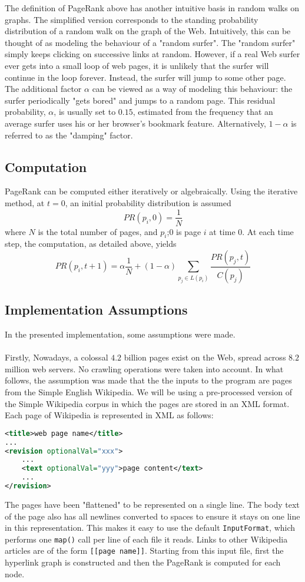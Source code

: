 \documentclass[11pt,a4paper]{article}
\begin{document}
The definition of PageRank above has another intuitive basis in random walks on graphs. The simplified version corresponds to the standing probability distribution of a random walk on the graph of the Web. Intuitively, this can be thought of as modeling the behaviour of a "random surfer". The "random surfer" simply keeps clicking on successive links at random. However, if a real Web surfer ever gets into a small loop of web pages, it is unlikely that the surfer will continue in the loop forever. Instead, the surfer will jump to some other page. The additional factor $\alpha$ can be viewed as a way of modeling this behaviour: the surfer periodically "gets bored" and jumps to a random page.  This residual probability, $\alpha$, is usually set to $0.15$, estimated from the frequency that an average surfer uses his or her browser's bookmark feature. Alternatively, $1 - \alpha$ is referred to as the "damping" factor.
\subsection{Computation}
PageRank can be computed either iteratively or algebraically. Using the iterative method, at $t = 0$, an initial probability distribution is assumed
$$PR(p_i, 0) = \frac{1}{N}$$
where $N$ is the total number of pages, and $p_i$;$0$ is page $i$ at time $0$. At each time step, the computation, as detailed above, yields
$$PR(p_i, t + 1) = \alpha \frac{1}{N} + (1 - \alpha) \sum_{p_j \in L(p_i)}\frac{PR(p_j, t)}{C(p_j)}$$
\subsection{Implementation Assumptions}
In the presented implementation, some assumptions were made.\\
\\
Firstly, 
Nowadays, a colossal $4.2$ billion pages exist on the Web, spread across $8.2$ million web servers. No crawling operations were taken into account. In what follows, the assumption was made that the the inputs to the program are pages from the Simple English Wikipedia. We will be using a pre-processed version of the Simple Wikipedia corpus in which the pages are stored in an XML format. Each page of Wikipedia is represented in XML as follows:
\begin{lstlisting}[language=xml]
<title>web page name</title>
...
<revision optionalVal="xxx">
    ...
    <text optionalVal="yyy">page content</text>
    ...
</revision>
\end{lstlisting}
The pages have been "flattened" to be represented on a single line. The body text of the page also has all newlines converted to spaces to ensure it stays on one line in this representation. This makes it easy to use the default \texttt{InputFormat}, which performs one \texttt{map()} call per line of each file it reads. Links to other Wikipedia articles are of the form \texttt{[[page name]]}. Starting from this input file, first the hyperlink graph is constructed and then the PageRank is computed for each node.
\end{document}
